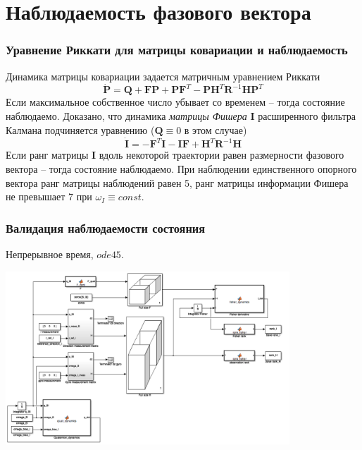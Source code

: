 \documentclass[utf8]{beamer}
\begin{document}
\section{Наблюдаемость фазового вектора}
\begin{frame}
\frametitle{Уравнение Риккати для матрицы ковариации и наблюдаемость}
Динамика матрицы ковариации задается матричным уравнением Риккати
$$
\dot{\mathbf{P}}=\mathbf{Q} + \mathbf{F}\mathbf{P}+\mathbf{P}\mathbf{F}^T-\mathbf{P}\mathbf{H}^T
\mathbf{R}^{-1}\mathbf{H}\mathbf{P}^T
$$
Если максимальное собственное число убывает со временем -- тогда состояние
наблюдаемо. Доказано, что динамика \emph{матрицы Фишера} $\mathbf{I}$
расширенного фильтра Калмана подчиняется уравнению ($\mathbf{Q}\equiv0$ в этом
случае)
$$
\dot{\mathbf{I}} =
-\mathbf{F}^T\mathbf{I}-\mathbf{IF}+\mathbf{H}^T\mathbf{R}^{-1}\mathbf{H}
$$
Если ранг матрицы $\mathbf{I}$ вдоль некоторой траектории равен размерности
фазового вектора -- тогда состояние наблюдаемо.
При наблюдении единственного опорного вектора ранг матрицы наблюдений равен 5,
ранг матрицы информации Фишера не превышает 7 при $\omega_I\equiv const$.
\end{frame}
\begin{frame}
\frametitle{Валидация наблюдаемости состояния}
Непрерывное время, $ode45$.
\begin{center}
    \includegraphics[width=0.8\textwidth]{pic/obs_check.png}
\end{center}
\end{frame}

\end{document}
